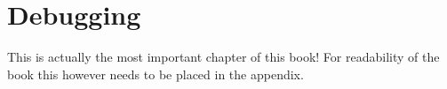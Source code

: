 \chapter{Debugging}

This is actually the most important chapter of this book! For readability of the
book this however needs to be placed in the appendix.

